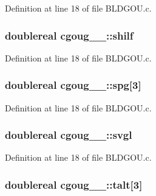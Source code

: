 Definition at line 18 of file B\+L\+D\+G\+O\+U.\+c.

\subsubsection[{\texorpdfstring{shilf}{shilf}}]{\setlength{\rightskip}{0pt plus 5cm}doublereal cgoug\+\_\+\_\+\+::shilf}\hypertarget{structcgoug__1___a8bced007623caa3e4e02e315f5a100c8}{}\label{structcgoug__1___a8bced007623caa3e4e02e315f5a100c8}


Definition at line 18 of file B\+L\+D\+G\+O\+U.\+c.

\subsubsection[{\texorpdfstring{spg}{spg}}]{\setlength{\rightskip}{0pt plus 5cm}doublereal cgoug\+\_\+\_\+\+::spg\mbox{[}3\mbox{]}}\hypertarget{structcgoug__1___a9e8c5560b919a84675e6cb1cc1168f72}{}\label{structcgoug__1___a9e8c5560b919a84675e6cb1cc1168f72}


Definition at line 18 of file B\+L\+D\+G\+O\+U.\+c.

\subsubsection[{\texorpdfstring{svgl}{svgl}}]{\setlength{\rightskip}{0pt plus 5cm}doublereal cgoug\+\_\+\_\+\+::svgl}\hypertarget{structcgoug__1___a323cc999ee5b3417fb2f7c9c83fea6e5}{}\label{structcgoug__1___a323cc999ee5b3417fb2f7c9c83fea6e5}


Definition at line 18 of file B\+L\+D\+G\+O\+U.\+c.

\subsubsection[{\texorpdfstring{talt}{talt}}]{\setlength{\rightskip}{0pt plus 5cm}doublereal cgoug\+\_\+\_\+\+::talt\mbox{[}3\mbox{]}}\hypertarget{structcgoug__1___ade4fd3917e934e658236dd395739b876}{}\label{structcgoug__1___ade4fd3917e934e658236dd395739b876}


